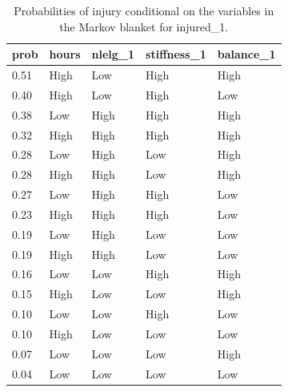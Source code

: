 \documentclass[man,floatsintext]{apa6}
\begin{document}
\begin{table}[H]

\begin{center}
\begin{threeparttable}

\caption{\label{tab:unnamed-chunk-8}Probabilities of injury conditional on the variables in the Markov blanket for injured\_1.}

\begin{tabular}{lllll}
\toprule
prob & \multicolumn{1}{c}{hours} & \multicolumn{1}{c}{nlelg\_1} & \multicolumn{1}{c}{stiffness\_1} & \multicolumn{1}{c}{balance\_1}\\
\midrule
0.51 & High & Low & High & High\\
0.40 & High & Low & High & Low\\
0.38 & Low & High & High & High\\
0.32 & High & High & High & High\\
0.28 & Low & High & Low & High\\
0.28 & High & High & Low & High\\
0.27 & Low & High & High & Low\\
0.23 & High & High & High & Low\\
0.19 & Low & High & Low & Low\\
0.19 & High & High & Low & Low\\
0.16 & Low & Low & High & High\\
0.15 & High & Low & Low & High\\
0.10 & Low & Low & High & Low\\
0.10 & High & Low & Low & Low\\
0.07 & Low & Low & Low & High\\
0.04 & Low & Low & Low & Low\\
\bottomrule
\end{tabular}

\end{threeparttable}
\end{center}

\end{table}
\end{document}
